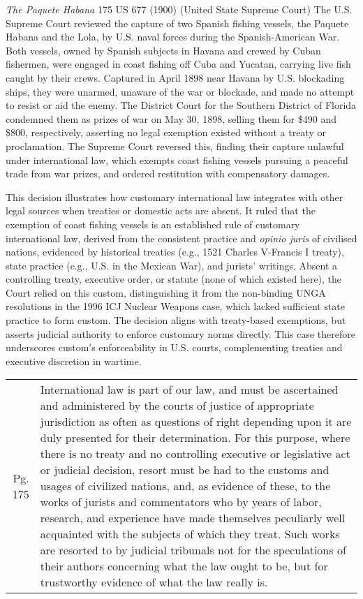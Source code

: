 \begin{casedetails}{\textit{The Paquete Habana} 175 US 677 (1900) (United State Supreme Court)}\label{case:Paquete Habana}
    \flushleft
    The U.S. Supreme Court reviewed the capture of two Spanish fishing vessels, the Paquete Habana and the Lola, by U.S. naval forces during the Spanish-American War. Both vessels, owned by Spanish subjects in Havana and crewed by Cuban fishermen, were engaged in coast fishing off Cuba and Yucatan, carrying live fish caught by their crews. Captured in April 1898 near Havana by U.S. blockading ships, they were unarmed, unaware of the war or blockade, and made no attempt to resist or aid the enemy. The District Court for the Southern District of Florida condemned them as prizes of war on May 30, 1898, selling them for \$490 and \$800, respectively, asserting no legal exemption existed without a treaty or proclamation. The Supreme Court reversed this, finding their capture unlawful under international law, which exempts coast fishing vessels pursuing a peaceful trade from war prizes, and ordered restitution with compensatory damages.

    \vspace{\baselineskip}

    This decision illustrates how customary international law integrates with other legal sources when treaties or domestic acts are absent. It ruled that the exemption of coast fishing vessels is an established rule of customary international law, derived from the consistent practice and \textit{opinio juris} of civilised nations, evidenced by historical treaties (e.g., 1521 Charles V-Francis I treaty), state practice (e.g., U.S. in the Mexican War), and jurists' writings. Absent a controlling treaty, executive order, or statute (none of which existed here), the Court relied on this custom, distinguishing it from the non-binding UNGA resolutions in the 1996 ICJ Nuclear Weapons case, which lacked sufficient state practice to form custom. The decision aligns with treaty-based exemptions, but asserts judicial authority to enforce customary norms directly. This case therefore underscores custom's enforceability in U.S. courts, complementing treaties and executive discretion in wartime.

    \begin{longtable}{r|>{\raggedright\arraybackslash}p{}}
        Pg. 175 & International law is part of our law, and must be ascertained and administered by the courts of justice of appropriate jurisdiction as often as questions of right depending upon it are duly presented for their determination. For this purpose, where there is no treaty and no controlling executive or legislative act or judicial decision, resort must be had to the customs and usages of civilized nations, and, as evidence of these, to the works of jurists and commentators who by years of labor, research, and experience have made themselves peculiarly well acquainted with the subjects of which they treat. Such works are resorted to by judicial tribunals not for the speculations of their authors concerning what the law ought to be, but for trustworthy evidence of what the law really is.
    \end{longtable}
\end{casedetails}

